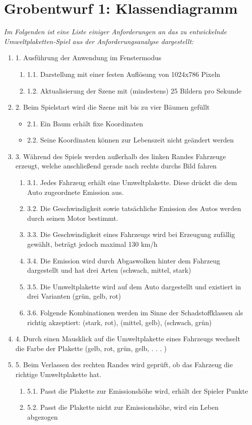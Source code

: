 \documentclass{article}
\begin{document}
\section{Grobentwurf 1: Klassendiagramm}
\textit{Im Folgenden ist eine Liste einiger Anforderungen an das zu entwickelnde Umweltplaketten-Spiel aus der Anforderungsanalyse dargestellt:}
\begin{enumerate}
    \item 1. Ausführung der Anwendung im Fenstermodus
    \begin{enumerate}
        \item 1.1. Darstellung mit einer festen Auflösung von 1024x786 Pixeln
        \item 1.2. Aktualisierung der Szene mit (mindestens) 25 Bildern pro Sekunde
    \end{enumerate}
    \item 2. Beim Spielstart wird die Szene mit bis zu vier Bäumen gefüllt
    \begin{itemize}
        \item 2.1. Ein Baum erhält fixe Koordinaten
        \item 2.2. Seine Koordinaten können zur Lebenszeit nicht geändert werden
    \end{itemize}
    \item 3. Während des Spiels werden außerhalb des linken Randes Fahrzeuge erzeugt, welche anschließend gerade nach rechts durchs Bild fahren
    \begin{enumerate}
        \item 3.1. Jedes Fahrzeug erhält eine Umweltplakette. Diese drückt die dem Auto zugeordnete Emission aus.
        \item 3.2. Die Geschwindigkeit sowie tatsächliche Emission des Autos werden durch seinen Motor bestimmt.
        \item 3.3. Die Geschwindigkeit eines Fahrzeugs wird bei Erzeugung zufällig gewählt, beträgt jedoch maximal 130 km/h
        \item 3.4. Die Emission wird durch Abgaswolken hinter dem Fahrzeug dargestellt und hat drei Arten (schwach, mittel, stark)
        \item 3.5. Die Umweltplakette wird auf dem Auto dargestellt und existiert in drei Varianten (grün, gelb, rot)
        \item 3.6. Folgende Kombinationen werden im Sinne der Schadstoffklassen als richtig akzeptiert: (stark, rot), (mittel, gelb), (schwach, grün)
    \end{enumerate}
    \item 4. Durch einen Mausklick auf die Umweltplakette eines Fahrzeugs wechselt die Farbe der Plakette (gelb, rot, grün, gelb, . . . )
    \item 5. Beim Verlassen des rechten Randes wird geprüft, ob das Fahrzeug die richtige Umweltplakette hat.
    \begin{enumerate}
        \item 5.1. Passt die Plakette zur Emissionshöhe wird, erhält der Spieler Punkte
        \item 5.2. Passt die Plakette nicht zur Emissionshöhe, wird ein Leben abgezogen
    \end{enumerate}
\end{enumerate}
\end{document}
